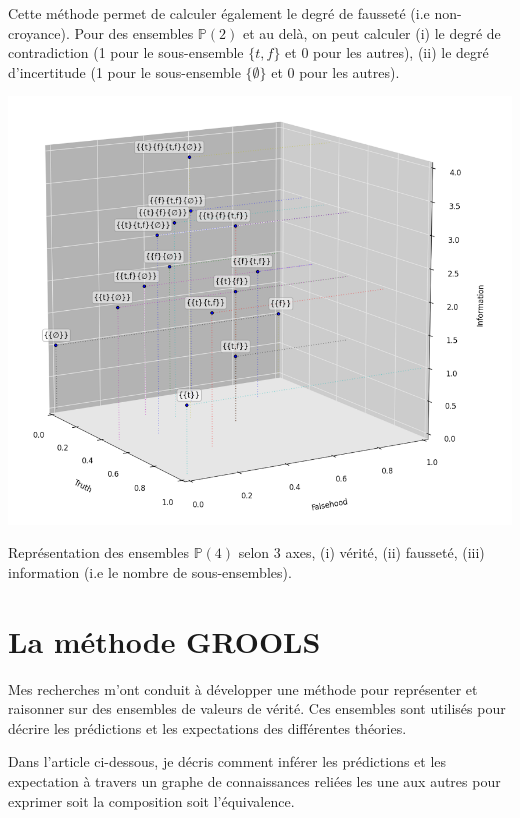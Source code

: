 \begin{refsegment}
Cette méthode permet de calculer également le degré de fausseté (i.e non-croyance). Pour des ensembles  $\mathbb{P}(2)$ et au delà, on peut calculer (i) le degré de contradiction (1 pour le sous-ensemble $\{t,f\}$ et 0 pour les autres), (ii) le degré d'incertitude (1 pour le sous-ensemble $\{\emptyset\}$ et 0 pour les autres).

\begin{shadedfigure}[H]
    \centering
    \includegraphics[width=\textwidth]{img/set_3d.png}
    \caption{Représentation des ensembles  $\mathbb{P}(4)$ selon 3 axes, (i) vérité, (ii) fausseté, (iii) information (i.e le nombre de sous-ensembles).}
    \label{fig:set3d}
\end{shadedfigure}

\section{La méthode GROOLS}\label{sec:methode}

Mes recherches m'ont conduit à développer une méthode pour représenter et raisonner sur des ensembles de valeurs de vérité. Ces ensembles sont utilisés pour décrire les prédictions et les expectations des différentes théories.

Dans l'article ci-dessous, je décris comment inférer les prédictions et les expectation à travers un graphe de connaissances reliées les une aux autres pour exprimer soit la composition soit l'équivalence.




\end{refsegment}
